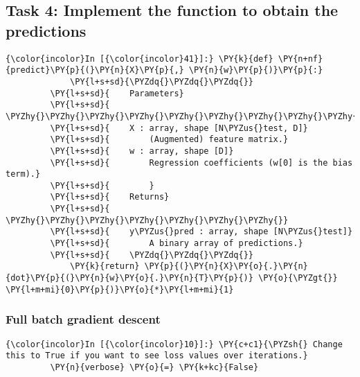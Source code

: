    \hypertarget{task-4-implement-the-function-to-obtain-the-predictions}{%
\subsection{Task 4: Implement the function to obtain the
predictions}\label{task-4-implement-the-function-to-obtain-the-predictions}}

    \begin{Verbatim}[commandchars=\\\{\}]
{\color{incolor}In [{\color{incolor}41}]:} \PY{k}{def} \PY{n+nf}{predict}\PY{p}{(}\PY{n}{X}\PY{p}{,} \PY{n}{w}\PY{p}{)}\PY{p}{:}
             \PY{l+s+sd}{\PYZdq{}\PYZdq{}\PYZdq{}}
         \PY{l+s+sd}{    Parameters}
         \PY{l+s+sd}{    \PYZhy{}\PYZhy{}\PYZhy{}\PYZhy{}\PYZhy{}\PYZhy{}\PYZhy{}\PYZhy{}\PYZhy{}\PYZhy{}}
         \PY{l+s+sd}{    X : array, shape [N\PYZus{}test, D]}
         \PY{l+s+sd}{        (Augmented) feature matrix.}
         \PY{l+s+sd}{    w : array, shape [D]}
         \PY{l+s+sd}{        Regression coefficients (w[0] is the bias term).}
         \PY{l+s+sd}{        }
         \PY{l+s+sd}{    Returns}
         \PY{l+s+sd}{    \PYZhy{}\PYZhy{}\PYZhy{}\PYZhy{}\PYZhy{}\PYZhy{}\PYZhy{}}
         \PY{l+s+sd}{    y\PYZus{}pred : array, shape [N\PYZus{}test]}
         \PY{l+s+sd}{        A binary array of predictions.}
         \PY{l+s+sd}{    \PYZdq{}\PYZdq{}\PYZdq{}}
             \PY{k}{return} \PY{p}{(}\PY{n}{X}\PY{o}{.}\PY{n}{dot}\PY{p}{(}\PY{n}{w}\PY{o}{.}\PY{n}{T}\PY{p}{)} \PY{o}{\PYZgt{}} \PY{l+m+mi}{0}\PY{p}{)}\PY{o}{*}\PY{l+m+mi}{1}
\end{Verbatim}

    \hypertarget{full-batch-gradient-descent}{%
\subsubsection{Full batch gradient
descent}\label{full-batch-gradient-descent}}

    \begin{Verbatim}[commandchars=\\\{\}]
{\color{incolor}In [{\color{incolor}10}]:} \PY{c+c1}{\PYZsh{} Change this to True if you want to see loss values over iterations.}
         \PY{n}{verbose} \PY{o}{=} \PY{k+kc}{False}
\end{Verbatim}

